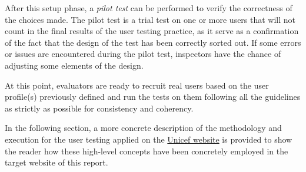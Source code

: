 After this setup phase, a \textit{pilot test} can be performed to verify the correctness of the choices made. The pilot test is a trial test on one or more users that will not count in the final results of the user testing practice, as it serve as a confirmation of the fact that the design of the test has been correctly sorted out.
If some errors or issues are encountered during the pilot test, inspectors have the chance of adjusting some elements of the design.

At this point, evaluators are ready to recruit real users based on the user profile(s) previously defined and run the tests on them following all the guidelines as strictly as possible for consistency and coherency.

In the following section, a more concrete description of the methodology and execution for the user testing applied on the \href{https://www.unicef.org/}{Unicef website} is provided to show the reader how these high-level concepts have been concretely employed in the target website of this report.